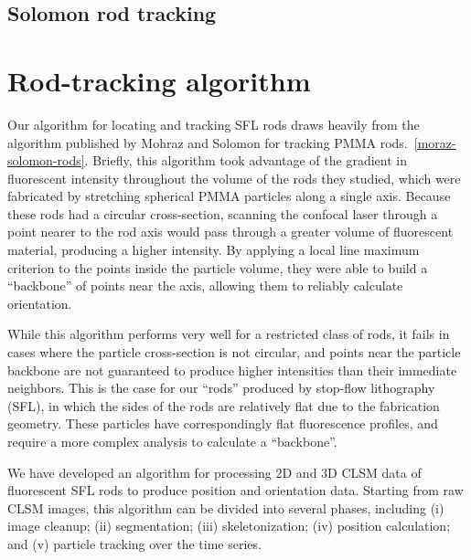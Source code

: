 \subsection{Solomon rod tracking}

\begin{itemize}
\end{itemize}

\section{Rod-tracking algorithm}
\label{sec:rod-tracking}

Our algorithm for locating and tracking SFL rods draws heavily from the algorithm published by 
Mohraz and Solomon for tracking PMMA rods.~\ref{moraz-solomon-rods}.  Briefly, this algorithm 
took advantage of the gradient in fluorescent intensity throughout the volume of the 
rods they studied, which were fabricated by stretching spherical PMMA particles along a single axis.
Because these rods had a circular cross-section, scanning the confocal laser through a point nearer
to the rod axis would pass through a greater volume of fluorescent material, producing a higher intensity.
By applying a local line maximum criterion to the points inside the particle volume, they were able to 
build a ``backbone'' of points near the axis, allowing them to reliably calculate orientation.

While this algorithm performs very well for a restricted class of rods, it fails in cases where the particle
cross-section is not circular, and points near the particle backbone are not guaranteed to produce higher 
intensities than their immediate neighbors.  This is the case for our ``rods'' produced by stop-flow
lithography (SFL), in which the sides of the rods are relatively flat due to the fabrication
geometry. These particles have correspondingly flat fluorescence profiles, and require a more complex analysis
to calculate a ``backbone''.

We have developed an algorithm for processing 2D and 3D CLSM data of fluorescent SFL rods to
produce position and orientation data.  Starting from raw CLSM images, this algorithm can be divided
into several phases, including (i) image cleanup; (ii) segmentation; (iii) skeletonization;
(iv) position calculation; and
(v) particle tracking over the time series.  

